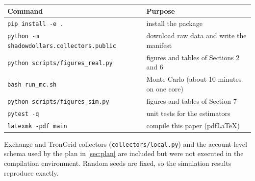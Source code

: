 \begin{center}\small
\begin{tabular}{@{}ll@{}}
\toprule
Command & Purpose \\
\midrule
\texttt{pip install -e .} & install the package \\
\texttt{python -m shadowdollars.collectors.public} & download raw data and write the manifest \\
\texttt{python scripts/figures\_real.py} & figures and tables of Sections 2 and 6 \\
\texttt{bash run\_mc.sh} & Monte Carlo (about 10 minutes on one core) \\
\texttt{python scripts/figures\_sim.py} & figures and tables of Section 7 \\
\texttt{pytest -q} & unit tests for the estimators \\
\texttt{latexmk -pdf main} & compile this paper (pdf\LaTeX{}) \\
\bottomrule
\end{tabular}
\end{center}

Exchange and TronGrid collectors (\texttt{collectors/local.py}) and the account-level schema used by the plan in
\cref{sec:plan} are included but were not executed in the compilation environment. Random seeds are fixed, so the
simulation results reproduce exactly.
